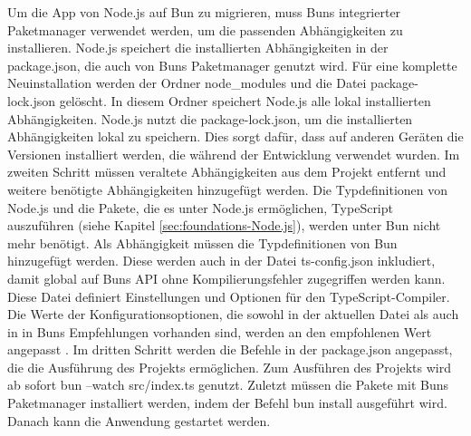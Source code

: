 \noindent
Um die App von Node.js auf Bun zu migrieren, muss Buns integrierter Paketmanager verwendet werden, um die passenden Abhängigkeiten zu installieren. Node.js speichert die installierten Abhängigkeiten in der \glqq package.json\grqq{}, die auch von Buns Paketmanager genutzt wird. Für eine komplette Neuinstallation werden der Ordner \glqq node\_modules\grqq{} und die Datei \glqq package-lock.json\grqq{} gelöscht. In diesem Ordner speichert Node.js alle lokal installierten Abhängigkeiten. Node.js nutzt die \glqq package-lock.json\grqq{}, um die installierten Abhängigkeiten lokal zu speichern. Dies sorgt dafür, dass auf anderen Geräten die Versionen installiert werden, die während der Entwicklung verwendet wurden. \newline
Im zweiten Schritt müssen veraltete Abhängigkeiten aus dem Projekt entfernt und weitere benötigte Abhängigkeiten hinzugefügt werden. Die Typdefinitionen von Node.js und die Pakete, die es unter Node.js ermöglichen, TypeScript auszuführen (siehe Kapitel \ref{sec:foundations-Node.js}), werden unter Bun nicht mehr benötigt. Als Abhängigkeit müssen die Typdefinitionen von Bun hinzugefügt werden. Diese werden auch in der Datei \glqq ts-config.json\grqq{} inkludiert, damit global auf Buns API ohne Kompilierungsfehler zugegriffen werden kann. Diese Datei definiert Einstellungen und Optionen für den TypeScript-Compiler. Die Werte der Konfigurationsoptionen, die sowohl in der aktuellen Datei als auch in in Buns Empfehlungen vorhanden sind, werden an den empfohlenen Wert angepasst \cite{OvenSh.2023c}.\newline 
Im dritten Schritt werden die Befehle in der \glqq package.json\grqq{} angepasst, die die Ausführung des Projekts ermöglichen. Zum Ausführen des Projekts wird ab sofort \glqq bun --watch src/index.ts\grqq{} genutzt. Zuletzt müssen die Pakete mit Buns Paketmanager installiert werden, indem der Befehl \glqq bun install\grqq{} ausgeführt wird. Danach kann die Anwendung gestartet werden.\\

